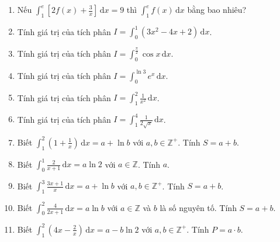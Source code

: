 \documentclass[12pt]{article}
\begin{document}
\begin{enumerate}[label=\textbf{Câu \arabic*.}]
		\item Nếu $\displaystyle \int_1^e \left[2f(x) + \frac{3}{x}\right]\,\mathrm{d}x = 9$ thì $\displaystyle \int_1^e f(x)\,\mathrm{d}x$ bằng bao nhiêu?
		\vspace{0.75cm}

		\item Tính giá trị của tích phân $I = \displaystyle \int_0^1 (3x^2 - 4x + 2)\,\mathrm{d}x$.
		\vspace{0.75cm}
		
		\item Tính giá trị của tích phân $I = \displaystyle \int_0^{\frac{\pi}{2}} \cos x\,\mathrm{d}x$.
		\vspace{0.75cm}
		
		\item Tính giá trị của tích phân $I = \displaystyle \int_0^{\ln 3} e^x\,\mathrm{d}x$.
		\vspace{0.75cm}
		
		\item Tính giá trị của tích phân $I = \displaystyle \int_1^2 \frac{1}{x^2}\,\mathrm{d}x$.
		\vspace{0.75cm}
		
		\item Tính giá trị của tích phân $I = \displaystyle \int_1^4 \frac{1}{2\sqrt{x}}\,\mathrm{d}x$.
		\vspace{0.75cm}
		
		\item Biết $\displaystyle \int_1^2 \left( 1 + \frac{1}{x} \right)\,\mathrm{d}x = a + \ln b$ với $a, b \in \mathbb{Z}^+$. Tính $S = a + b$.
		\vspace{0.75cm}
		
		\item Biết $\displaystyle \int_0^1 \frac{2}{x+1}\,\mathrm{d}x = a\ln 2$ với $a \in \mathbb{Z}$. Tính $a$.
		\vspace{0.75cm}
		
		\item Biết $\displaystyle \int_1^3 \frac{3x+1}{x}\,\mathrm{d}x = a + \ln b$ với $a, b \in \mathbb{Z}^+$. Tính $S = a + b$.
		\vspace{0.75cm}
		
		\item Biết $\displaystyle \int_0^2 \frac{4}{2x+1}\,\mathrm{d}x = a\ln b$ với $a \in \mathbb{Z}$ và $b$ là số nguyên tố. Tính $S = a + b$.
		\vspace{0.75cm}
		
		\item Biết $\displaystyle \int_1^2 \left( 4x - \frac{2}{x} \right)\,\mathrm{d}x = a - b\ln 2$ với $a, b \in \mathbb{Z}^+$. Tính $P = a \cdot b$.
		\vspace{0.75cm}
		

\end{enumerate}
\end{document}
